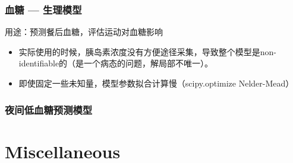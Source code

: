 \begin{frame}
\begin{columns}
\end{columns}


\end{frame}


\begin{frame}
\frametitle{血糖 --- 生理模型}

用途：预测餐后血糖，评估运动对血糖影响

\vspace{1em}

\begin{itemize}
    \item<3-> 实际使用的时候，胰岛素浓度没有方便途径采集，导致整个模型是non-identifiable的（是一个病态的问题，解局部不唯一）。
    \item<4-> 即使固定一些未知量，模型参数拟合计算慢（scipy.optimize Nelder-Mead）
\end{itemize}

\end{frame}


\begin{frame}
\frametitle{夜间低血糖预测模型}

\vspace{1em}

\vspace{1em}


\end{frame}


\section[Misc]{Miscellaneous}


